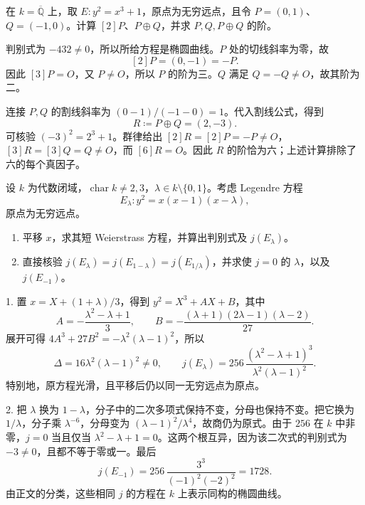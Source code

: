 \begin{exercise}\label{b3:ex:H-order-six-points}
	在 \(k=\overline{\mathbb Q}\) 上，取 \(E:y^2=x^3+1\)，原点为无穷远点，且令 \(P=(0,1)\)、\(Q=(-1,0)\)。计算 \([2]P\)、\(P\oplus Q\)，并求 \(P,Q,P\oplus Q\) 的阶。
\end{exercise}
\begin{solution}
	判别式为 \(-432\ne0\)，所以所给方程是椭圆曲线。\(P\) 处的切线斜率为零，故
	\[
		[2]P=(0,-1)=-P.
	\]
	因此 \([3]P=O\)，又 \(P\ne O\)，所以 \(P\) 的阶为三。\(Q\) 满足 \(Q=-Q\ne O\)，故其阶为二。

	连接 \(P,Q\) 的割线斜率为 \((0-1)/(-1-0)=1\)。代入割线公式，得到
	\[
		R\coloneqq P\oplus Q=(2,-3).
	\]
	可核验 \((-3)^2=2^3+1\)。群律给出 \([2]R=[2]P=-P\ne O\)，\([3]R=[3]Q=Q\ne O\)，而 \([6]R=O\)。因此 \(R\) 的阶恰为六；上述计算排除了六的每个真因子。
\end{solution}

\begin{exercise}\label{b3:ex:H-legendre-j}
	设 \(k\) 为代数闭域，\(\operatorname{char}k\ne2,3\)，\(\lambda\in k\setminus\{0,1\}\)。考虑 Legendre 方程
	\[
		E_\lambda:y^2=x(x-1)(x-\lambda),
	\]
	原点为无穷远点。
	\begin{enumerate}
		\item 平移 \(x\)，求其短 Weierstrass 方程，并算出判别式及 \(j(E_\lambda)\)。
		\item 直接核验 \(j(E_\lambda)=j(E_{1-\lambda})=j(E_{1/\lambda})\)，并求使 \(j=0\) 的 \(\lambda\)，以及 \(j(E_{-1})\)。
	\end{enumerate}
\end{exercise}
\begin{solution}
	1. 置 \(x=X+(1+\lambda)/3\)，得到 \(y^2=X^3+AX+B\)，其中
	\[
		A=-\frac{\lambda^2-\lambda+1}{3},\qquad
		B=-\frac{(\lambda+1)(2\lambda-1)(\lambda-2)}{27}.
	\]
	展开可得 \(4A^3+27B^2=-\lambda^2(\lambda-1)^2\)，所以
	\[
		\Delta=16\lambda^2(\lambda-1)^2\ne0,
		\qquad
		j(E_\lambda)=256\,\frac{(\lambda^2-\lambda+1)^3}{\lambda^2(\lambda-1)^2}.
	\]
	特别地，原方程光滑，且平移后仍以同一无穷远点为原点。

	2. 把 \(\lambda\) 换为 \(1-\lambda\)，分子中的二次多项式保持不变，分母也保持不变。把它换为 \(1/\lambda\)，分子乘 \(\lambda^{-6}\)，分母变为 \((\lambda-1)^2/\lambda^4\)，故商仍为原式。由于 \(256\) 在 \(k\) 中非零，\(j=0\) 当且仅当 \(\lambda^2-\lambda+1=0\)。这两个根互异，因为该二次式的判别式为 \(-3\ne0\)，且都不等于零或一。最后
	\[
		j(E_{-1})=256\,\frac{3^3}{(-1)^2(-2)^2}=1728.
	\]
	由正文的分类，这些相同 \(j\) 的方程在 \(k\) 上表示同构的椭圆曲线。
\end{solution}

